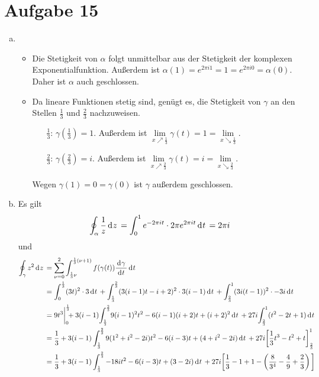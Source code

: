 \documentclass{article}
\theoremstyle{definition}
\begin{document}
\section*{Aufgabe 15}
\begin{enumerate}[(a)]
	\item \begin{itemize}
		\item Die Stetigkeit von $\alpha$ folgt unmittelbar aus der Stetigkeit der komplexen Exponentialfunktion. Außerdem ist $\alpha(1) = e^{2\pi i 1} = 1 = e^{2\pi i 0} = \alpha(0)$. Daher ist $\alpha$ auch geschlossen.
		\item Da lineare Funktionen stetig sind, genügt es, die Stetigkeit von $\gamma$ an den Stellen $\frac{1}{3}$ und $\frac{2}{3}$ nachzuweisen.
		\begin{itemize}
			\item[$\frac{1}{3}$:] $\gamma\left(\frac{1}{3}\right) = 1$. Außerdem ist $\lim\limits_{x\nearrow\frac{1}{3}} \gamma(t) = 1 = \lim\limits_{x\searrow \frac{1}{3}}$.
			\item[$\frac{2}{3}$:] $\gamma\left(\frac{2}{3}\right) = i$.  Außerdem ist $\lim\limits_{x\nearrow\frac{2}{3}} \gamma(t) = i = \lim\limits_{x\searrow \frac{2}{3}}$.
		\end{itemize}
		Wegen $\gamma(1) = 0 = \gamma(0)$ ist $\gamma$ außerdem geschlossen.
	\end{itemize}
	\item Es gilt $$\oint_\alpha \frac{1}{z} \d z = \int_0^1 e^{-2\pi i t}\cdot 2\pi e^{2\pi i t} \d t = 2\pi i$$ und
	\begin{align*}
		\oint_\gamma z^2 \d z &= \sum_{\nu = 0}^{2} \int_{\frac{1}{3} \nu}^{\frac{1}{3}(\nu +1)} f(\gamma(t)) \frac{\d \gamma}{\d t}\d t\\
		&= \int_0^\frac{1}{3} (3t)^2 \cdot 3 \d t + \int_\frac{1}{3}^\frac{2}{3} (3 (i-1)t - i+2)^2 \cdot 3(i-1) \d t + \int_\frac{2}{3}^1 (3 i (t-1))^2 \cdot - 3i \d t\\
		&= 9 t^3\bigg|_0^\frac{1}{3}\!\!\!+ 3(i-1)\! \int_\frac{1}{3}^\frac{2}{3}\! 9 (i-1)^2 t^2 - 6(i-1)(i+2)t + (i+2)^2 \d t + 27i\! \int_\frac{2}{3}^1 (t^2 - 2t + 1) \d t\\
		&= \frac{1}{3} + 3(i-1) \int_\frac{1}{3}^\frac{2}{3} 9 (1^2 + i^2 -2i)t^2 - 6(i-3)t + (4 +i^2-2i) \d t + 27i  \bigg[\frac{1}{3}t^3 - t^2 + t\bigg]_\frac{2}{3}^1\\
		&= \frac{1}{3} + 3(i-1) \int_\frac{1}{3}^\frac{2}{3} -18it^2 - 6(i-3)t + (3-2i) \d t + 27i  \bigg[\frac{1}{3} - 1 + 1-\left(\frac{8}{3^4} - \frac{4}{9} + \frac{2}{3}\right)\bigg]\\

\end{align*}
\end{enumerate}
\end{document}
